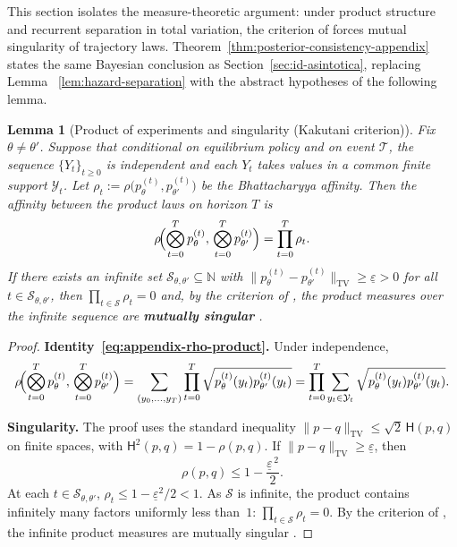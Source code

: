 \documentclass[ecta,nameyear,final,supplement]{econsocart}
\numberwithin{equation}{section}
\numberwithin{table}{section}
\newtheorem{lemma}[theorem]{Lemma}
\theoremstyle{definition}
\begin{document}
\noindent This section isolates the measure-theoretic argument: under product
structure and recurrent separation in total variation, the criterion of
\citet{Kakutani1948} forces mutual singularity of trajectory laws.
Theorem~\ref{thm:posterior-consistency-appendix} states the same Bayesian
conclusion as Section~\ref{sec:id-asintotica}, replacing Lemma
~\ref{lem:hazard-separation} with the abstract hypotheses of the following
lemma.


\begin{lemma}[Product of experiments and singularity (Kakutani criterion)]
\label{lem:general-id-appendix}
Fix $\theta\neq\theta'$. Suppose that conditional on equilibrium policy and
on event $\mathcal{T}$, the sequence $\{Y_t\}_{t\ge 0}$ is independent and each
$Y_t$ takes values in a common finite support $\mathcal{Y}_t$. Let
$\rho_t:=\rho\bigl(p_\theta^{(t)},p_{\theta'}^{(t)}\bigr)$ be the
Bhattacharyya affinity. Then the affinity between the product laws on horizon
$T$ is
\begin{equation}
\label{eq:appendix-rho-product}
\rho\!\Bigl(\bigotimes_{t=0}^{T}p_\theta^{(t)},\,
            \bigotimes_{t=0}^{T}p_{\theta'}^{(t)}\Bigr)
=\prod_{t=0}^{T}\rho_t.
\end{equation}
If there exists an infinite set $\mathcal{S}_{\theta,\theta'}\subseteq\mathbb{N}$
with $\|p_\theta^{(t)}-p_{\theta'}^{(t)}\|_{\mathrm{TV}}\ge\underline\varepsilon>0$
for all $t\in\mathcal{S}_{\theta,\theta'}$, then
$\prod_{t\in\mathcal{S}}\rho_t=0$ and, by the criterion of
\citet{Kakutani1948}, the product measures over the infinite sequence are
\textbf{mutually singular} \citep{Shiryaev2019Probability}.
\end{lemma}

\begin{proof}
\textbf{Identity~\eqref{eq:appendix-rho-product}.}
Under independence,
\[
\rho\!\Bigl(\bigotimes_{t=0}^{T}p_\theta^{(t)},\,
            \bigotimes_{t=0}^{T}p_{\theta'}^{(t)}\Bigr)
=\sum_{(y_0,\ldots,y_T)}\prod_{t=0}^{T}\sqrt{p_\theta^{(t)}(y_t)p_{\theta'}^{(t)}(y_t)}
=\prod_{t=0}^{T}\sum_{y_t\in\mathcal{Y}_t}
  \sqrt{p_\theta^{(t)}(y_t)p_{\theta'}^{(t)}(y_t)}.
\]

\noindent\textbf{Singularity.}
The proof uses the standard inequality
$\|p-q\|_{\mathrm{TV}}\le\sqrt{2}\,\mathsf{H}(p,q)$
on finite spaces, with $\mathsf{H}^2(p,q)=1-\rho(p,q)$. If
$\|p-q\|_{\mathrm{TV}}\ge\underline\varepsilon$, then
\[
\rho(p,q)\le 1-\frac{\underline\varepsilon^{\,2}}{2}.
\]
At each $t\in\mathcal{S}_{\theta,\theta'}$,
$\rho_t\le 1-\underline\varepsilon^2/2<1$. As $\mathcal{S}$ is infinite, the
product contains infinitely many factors uniformly less than~$1$:
$\prod_{t\in\mathcal{S}}\rho_t=0$. By the criterion of \citet{Kakutani1948},
the infinite product measures are mutually singular
\citep{Shiryaev2019Probability}.
\end{proof}
\end{document}
